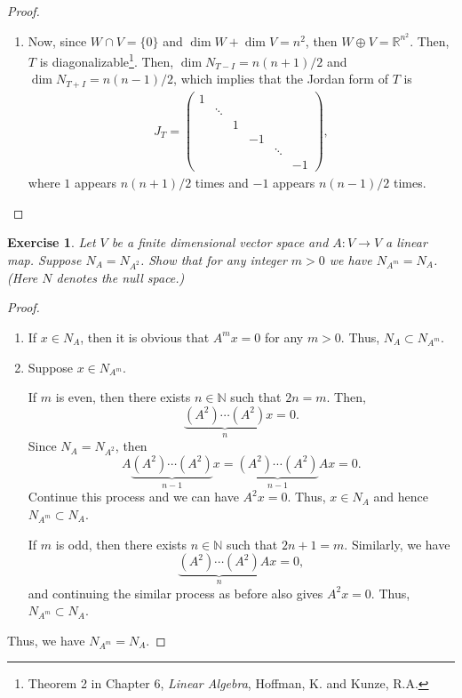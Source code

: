 \documentclass[11pt]{article}
\newtheorem{exercise}{Exercise}[section]
\theoremstyle{definition}
\numberwithin{equation}{subsection}
\begin{document}
\begin{proof}
\begin{enumerate}[label=(\alph*)]
    \item Now, since $W \cap V = \{0\}$ and $\dim W + \dim V = n^2$, then $W \oplus V = \mathbb{R}^{n^2}$. Then, $T$ is diagonalizable\footnote{Theorem 2 in Chapter 6, \textit{Linear Algebra}, Hoffman, K. and Kunze, R.A.}. Then, $\dim N_{T - I} = n(n+1)/2$ and $\dim N_{T + I} = n(n-1)/2$, which implies that the Jordan form of $T$ is
    \begin{align*}
        J_T = \begin{pmatrix}
            1 & & & & & \\
            & \ddots & & & & \\
            & & 1 & & & \\
            & & & -1 & & \\
            & & & & \ddots & \\
            & & & & & -1
        \end{pmatrix},
    \end{align*}
    where $1$ appears $n(n+1)/2$ times and $-1$ appears $n(n-1)/2$ times.
\end{enumerate}
\end{proof}

\medskip

\newpage
\begin{exercise}\label{August_2016_2}
Let $V$ be a finite dimensional vector space and $A: V \to V$ a linear map. Suppose $N_A = N_{A^2}$. Show that for any integer $m > 0$ we have $N_{A^m} = N_A$. (Here $N$ denotes the null space.)
\end{exercise}
\begin{proof}
~\begin{enumerate}[label=(\alph*)]
    \item If $x \in N_A$, then it is obvious that $A^m x = 0$ for any $m > 0$. Thus, $N_A \subset N_{A^m}$.
    
    \item Suppose $x \in N_{A^m}$. 
    
    If $m$ is even, then there exists $n \in \mathbb{N}$ such that $2n = m$. Then, 
    $$\underbrace{(A^2) \cdots (A^2)}_{n} x = 0.$$ 
    Since $N_A = N_{A^2}$, then 
    $$A \underbrace{(A^2) \cdots (A^2)}_{n - 1} x = \underbrace{(A^2) \cdots (A^2)}_{n-1} A x = 0.$$ 
    Continue this process and we can have $A^2x = 0$. Thus, $x \in N_A$ and hence $N_{A^m} \subset N_A$.
    
    If $m$ is odd, then there exists $n \in \mathbb{N}$ such that $2n + 1 = m$. Similarly, we have 
    $$\underbrace{(A^2) \cdots (A^2)}_{n} A x = 0,$$ 
    and continuing the similar process as before also gives $A^2x = 0$. Thus, $N_{A^m} \subset N_A$.
\end{enumerate}
Thus, we have $N_{A^m} = N_A$.
\end{proof}
\end{document}
